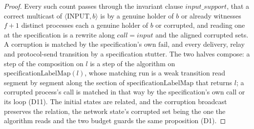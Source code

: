 \begin{proof}
  Every such count passes through the invariant clause $input\_support$, that a correct multicast of $\langle\mathrm{INPUT},b\rangle$ is by a genuine holder of $b$ or already witnesses $f{+}1$ distinct processes each a genuine holder of $b$ or corrupted, and reading one at the specification is a rewrite along $call = \mathit{input}$ and the aligned corrupted sets.
  A corruption is matched by the specification's own $\mathrm{fail}$, and every delivery, relay and protocol-send transition by a specification stutter.
  The two halves compose: a step of the composition on $l$ is a step of the algorithm on $\mathrm{specificationLabelMap}(l)$, whose matching run is a weak transition read segment by segment along the section of $\mathrm{specificationLabelMap}$ that returns $l$; a corrupted process's call is matched in that way by the specification's own call or its loop (D11).
  The initial states are related, and the corruption broadcast preserves the relation, the network state's corrupted set being the one the algorithm reads and the two budget guards the same proposition (D1).
\end{proof}
